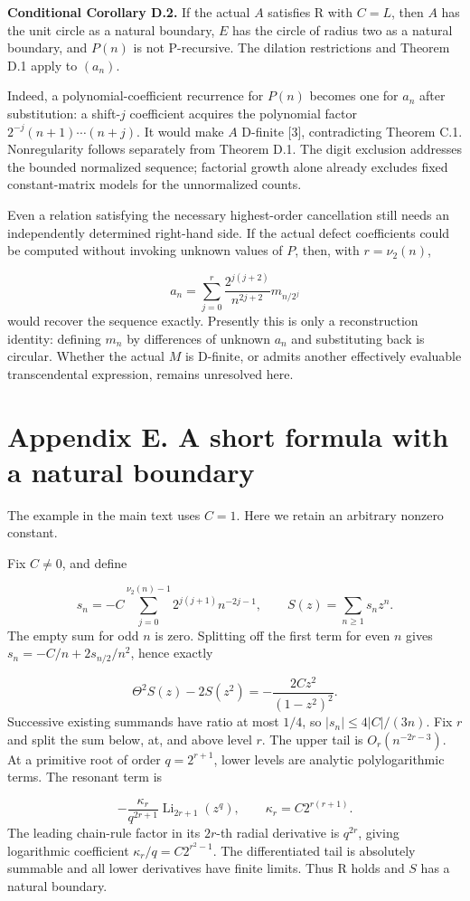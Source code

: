 \documentclass[11pt,a4paper]{article}
\begin{document}
\textbf{Conditional Corollary D.2.} If the actual $A$ satisfies R with $C=L$, then $A$ has the unit circle as a natural boundary, $E$ has the circle of radius two as a natural boundary, and $P(n)$ is not P-recursive. The dilation restrictions and Theorem D.1 apply to $(a_n)$.

Indeed, a polynomial-coefficient recurrence for $P(n)$ becomes one for $a_n$ after substitution: a shift-$j$ coefficient acquires the polynomial factor $2^{-j}(n+1)\cdots(n+j)$. It would make $A$ D-finite [3], contradicting Theorem C.1. Nonregularity follows separately from Theorem D.1. The digit exclusion addresses the bounded normalized sequence; factorial growth alone already excludes fixed constant-matrix models for the unnormalized counts.

Even a relation satisfying the necessary highest-order cancellation still needs an independently determined right-hand side. If the actual defect coefficients could be computed without invoking unknown values of $P$, then, with $r=\nu_2(n)$,

\[
a_n=\sum_{j=0}^{r}\frac{2^{j(j+2)}}{n^{2j+2}}m_{n/2^j}
\]
would recover the sequence exactly. Presently this is only a reconstruction identity: defining $m_n$ by differences of unknown $a_n$ and substituting back is circular. Whether the actual $M$ is D-finite, or admits another effectively evaluable transcendental expression, remains unresolved here.

\section*{Appendix E. A short formula with a natural boundary}
The example in the main text uses $C=1$. Here we retain an arbitrary nonzero constant.

Fix $C\ne0$, and define

\[
s_n=-C\sum_{j=0}^{\nu_2(n)-1}2^{j(j+1)}n^{-2j-1},\qquad
S(z)=\sum_{n\ge1}s_nz^n.
\]
The empty sum for odd $n$ is zero. Splitting off the first term for even $n$ gives $s_n=-C/n+2s_{n/2}/n^2$, hence exactly

\[
\Theta^2S(z)-2S(z^2)=-\frac{2Cz^2}{(1-z^2)^2}.
\]
Successive existing summands have ratio at most $1/4$, so $|s_n|\le4|C|/(3n)$. Fix $r$ and split the sum below, at, and above level $r$. The upper tail is $O_r(n^{-2r-3})$. At a primitive root of order $q=2^{r+1}$, lower levels are analytic polylogarithmic terms. The resonant term is

\[
-\frac{\kappa_r}{q^{2r+1}}\operatorname{Li}_{2r+1}(z^q),
\qquad \kappa_r=C2^{r(r+1)}.
\]
The leading chain-rule factor in its $2r$-th radial derivative is $q^{2r}$, giving logarithmic coefficient $\kappa_r/q=C2^{r^2-1}$. The differentiated tail is absolutely summable and all lower derivatives have finite limits. Thus R holds and $S$ has a natural boundary.
\end{document}
